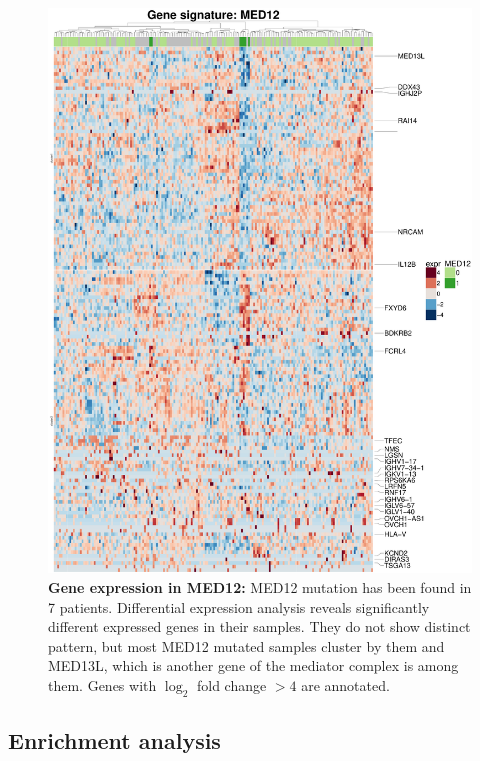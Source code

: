 \begin{figure}
	\centering
	\includegraphics[width=\columnwidth]{./Figures/gene_exprMED12_gsea_Hallmark.pdf}
	\caption{\textbf{Gene expression in MED12:} MED12 mutation has been found in 7 patients. Differential expression analysis reveals significantly different expressed genes in their samples. They do not show distinct pattern, but most MED12 mutated samples cluster by them and MED13L, which is another gene of the mediator complex is among them. Genes with $\log_2$ fold change $>4$ are annotated.}
	\label{fig:gene_exprMED12_gsea_Hallmark}
\end{figure}


\FloatBarrier

\subsection{Enrichment analysis}

